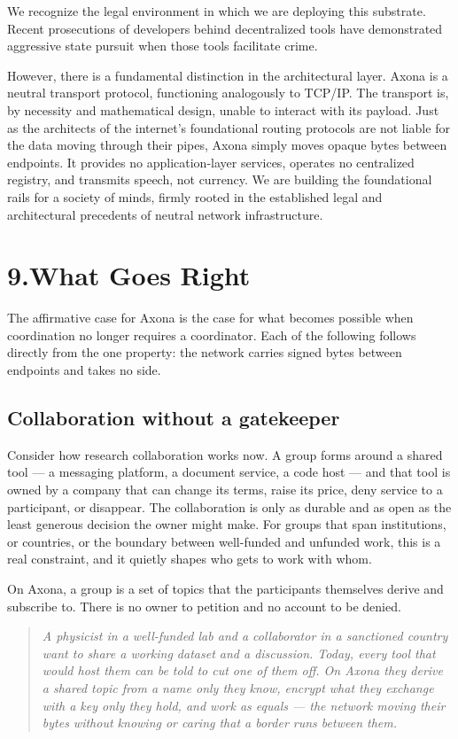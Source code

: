 \documentclass[nobib,justified]{tufte-handout}
\newcommand{\pullquote}[1]{%
  \begin{quote}\itshape\color{rust} #1 \end{quote}}
\begin{document}
We recognize the legal environment in which we are deploying this substrate.
Recent prosecutions of developers behind decentralized tools have demonstrated
aggressive state pursuit when those tools facilitate crime.

However, there is a fundamental distinction in the architectural layer. Axona is
a neutral transport protocol, functioning analogously to TCP/IP. The transport
is, by necessity and mathematical design, unable to interact with its payload.
Just as the architects of the internet's foundational routing protocols are not
liable for the data moving through their pipes, Axona simply moves opaque bytes
between endpoints. It provides no application-layer services, operates no
centralized registry, and transmits speech, not currency. We are building the
foundational rails for a society of minds, firmly rooted in the established legal
and architectural precedents of neutral network infrastructure.

\section{9.\quad What Goes Right}

The affirmative case for Axona is the case for what becomes possible when
coordination no longer requires a coordinator. Each of the following follows
directly from the one property: the network carries signed bytes between
endpoints and takes no side.

\subsection{Collaboration without a gatekeeper}

Consider how research collaboration works now. A group forms around a shared
tool --- a messaging platform, a document service, a code host --- and that tool
is owned by a company that can change its terms, raise its price, deny service
to a participant, or disappear. The collaboration is only as durable and as open
as the least generous decision the owner might make. For groups that span
institutions, or countries, or the boundary between well-funded and unfunded
work, this is a real constraint, and it quietly shapes who gets to work with
whom.

On Axona, a group is a set of topics that the participants themselves derive and
subscribe to. There is no owner to petition and no account to be denied.

\pullquote{A physicist in a well-funded lab and a collaborator in a sanctioned
country want to share a working dataset and a discussion. Today, every tool that
would host them can be told to cut one of them off. On Axona they derive a shared
topic from a name only they know, encrypt what they exchange with a key only they
hold, and work as equals --- the network moving their bytes without knowing or
caring that a border runs between them.}
\end{document}

